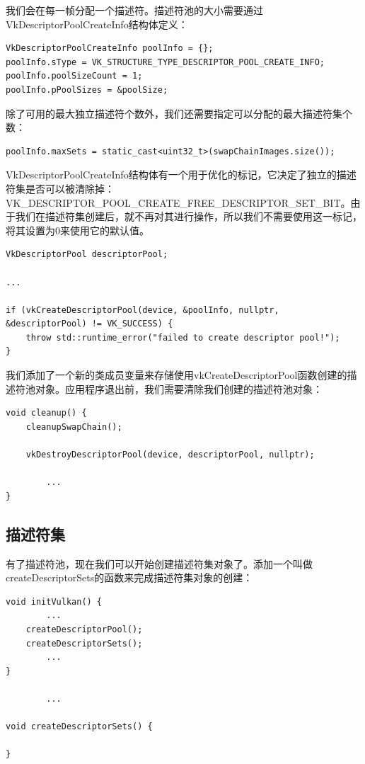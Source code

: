 \documentclass{ctexart}
\begin{document}
我们会在每一帧分配一个描述符。描述符池的大小需要通过VkDescriptorPoolCreateInfo结构体定义：

\begin{lstlisting}[language={[ANSI]C}]
VkDescriptorPoolCreateInfo poolInfo = {};
poolInfo.sType = VK_STRUCTURE_TYPE_DESCRIPTOR_POOL_CREATE_INFO;
poolInfo.poolSizeCount = 1;
poolInfo.pPoolSizes = &poolSize;
\end{lstlisting}

除了可用的最大独立描述符个数外，我们还需要指定可以分配的最大描述符集个数：

\begin{lstlisting}[language={[ANSI]C}]
poolInfo.maxSets = static_cast<uint32_t>(swapChainImages.size());
\end{lstlisting}

VkDescriptorPoolCreateInfo结构体有一个用于优化的标记，它决定了独立的描述符集是否可以被清除掉：VK\_DESCRIPTOR\_POOL\_CREATE\_FREE\_DESCRIPTOR\_SET\_BIT。由于我们在描述符集创建后，就不再对其进行操作，所以我们不需要使用这一标记，将其设置为0来使用它的默认值。

\begin{lstlisting}[language={[ANSI]C}]
VkDescriptorPool descriptorPool;

...

if (vkCreateDescriptorPool(device, &poolInfo, nullptr, &descriptorPool) != VK_SUCCESS) {
	throw std::runtime_error("failed to create descriptor pool!");
}
\end{lstlisting}

我们添加了一个新的类成员变量来存储使用vkCreateDescriptorPool函数创建的描述符池对象。应用程序退出前，我们需要清除我们创建的描述符池对象：

\begin{lstlisting}[language={[ANSI]C}]
void cleanup() {
	cleanupSwapChain();

	vkDestroyDescriptorPool(device, descriptorPool, nullptr);

		...
}
\end{lstlisting}

\subsection{描述符集}

有了描述符池，现在我们可以开始创建描述符集对象了。添加一个叫做createDescriptorSets的函数来完成描述符集对象的创建：

\begin{lstlisting}[language={[ANSI]C}]
void initVulkan() {
		...
	createDescriptorPool();
	createDescriptorSets();
		...
}

		...

void createDescriptorSets() {

}
\end{lstlisting}
\end{document}
